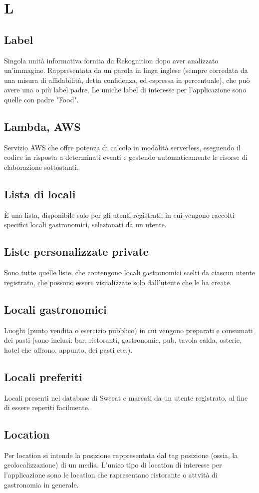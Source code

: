 \section{L}

\subsection{Label}
Singola unità informativa fornita da Rekognition dopo aver analizzato un'immagine. Rappresentata da un parola in linga inglese (sempre corredata da una misura di affidabilità, detta confidenza, ed espressa in percentuale), che può avere una o più label padre. Le uniche label di interesse per l'applicazione sono quelle con padre "Food".

\subsection{Lambda, AWS}
Servizio AWS che offre potenza di calcolo in modalità serverless, eseguendo il codice in risposta a determinati eventi e gestendo automaticamente le risorse di elaborazione sottostanti. 

\subsection{Lista di locali} È una lista, disponibile solo per gli utenti registrati, in cui vengono raccolti specifici locali gastronomici, selezionati da un utente.

\subsection{Liste personalizzate private} Sono tutte quelle liste, che contengono locali gastronomici scelti da ciascun utente registrato, che possono essere visualizzate solo dall’utente che le ha create.

\subsection{Locali gastronomici} Luoghi (punto vendita o esercizio pubblico) in cui vengono preparati e consumati dei pasti (sono inclusi: bar, ristoranti, gastronomie, pub, tavola calda, osterie, hotel che offrono, appunto, dei pasti etc.).

\subsection{Locali preferiti} Locali presenti nel database di Sweeat e marcati da un utente registrato, al fine di essere reperiti facilmente.

\subsection{Location}
Per location si intende la posizione rappresentata dal tag posizione (ossia, la geolocalizzazione) di un media. L'unico tipo di location di interesse per l'applicazione sono le location che rapresentano ristorante o attvità di gastronomia in generale.

\clearpage